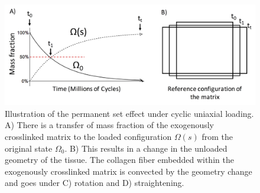 \begin{figure}[hbt]
\centering
\includegraphics[width=0.5\paperwidth]{Images/chapter4/figure3}
\caption{Illustration of the permanent set effect under cyclic uniaxial loading. A) There is a transfer of mass fraction of the exogenously crosslinked matrix to the loaded configuration $\Omega(s)$ from the original state $\Omega_0$. B) This results in a change in the unloaded geometry of the tissue. The collagen fiber embedded within the exogenously crosslinked matrix is convected by the geometry change and goes under C) rotation and D) straightening.}
\label{fig:PS}
\end{figure}
	
